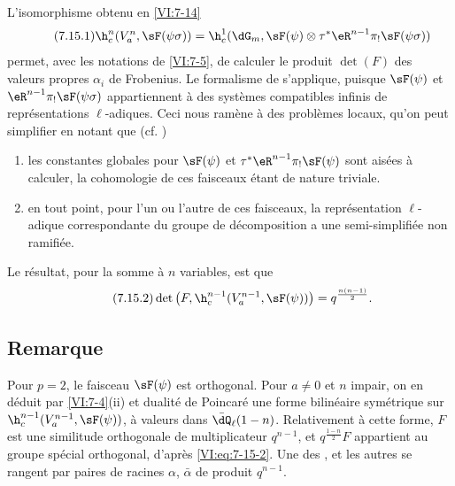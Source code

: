 L'isomorphisme obtenu en \ref{VI:7-14} 
\begin{equation*}\tag{7.15.1}\label{VI:eq:7-15-1}
  \h_c^n(V_a^n,\sF(\psi\sigma)) = \h_c^1(\dG_m,\sF(\psi)\otimes \tau^\ast \eR^{n-1} \pi_! \sF(\psi\sigma)) 
\end{equation*}
permet, avec les notations de \ref{VI:7-5}, de calculer le produit $\det(F)$ 
des valeurs propres $\alpha_i$ de Frobenius. Le formalisme de  
s'applique, puisque $\sF(\psi)$ et $\eR^{n-1} \pi_! \sF(\psi\sigma)$ 
appartiennent à des systèmes compatibles infinis de représentations 
$\ell$-adiques. Ceci nous ramène à des problèmes locaux, qu'on peut 
simplifier en notant que (cf. ) 
\begin{enumerate}[\indent a)]
  \item les constantes globales pour 
    $\sF(\psi)$ et $\tau^\ast \eR^{n-1} \pi_! \sF(\psi)$ sont aisées à 
    calculer, la cohomologie de ces faisceaux étant de nature triviale. 
  \item en tout point, pour l'un ou l'autre de ces faisceaux, la 
    représentation $\ell$-adique correspondante du groupe de décomposition 
    a une semi-simplifiée non ramifiée. 
\end{enumerate}

Le résultat, pour la somme à $n$ variables, est que 
\begin{equation*}\tag{7.15.2}\label{VI:eq:7-15-2}
  \det\left(F,\h_c^{n-1}(V_a^{n-1},\sF(\psi))\right) = q^{\frac{n(n-1)}{2}} \text{.} 
\end{equation*}





\subsection{Remarque}\label{VI:7-16}

Pour $p=2$, le faisceau $\sF(\psi)$ est orthogonal. Pour $a\ne 0$ et $n$ 
impair, on en déduit par \ref{VI:7-4}(ii) et dualité de Poincaré une 
forme bilinéaire symétrique sur $\h_c^{n-1}(V_a^{n-1},\sF(\psi))$, à 
valeurs dans $\bar\dQ_\ell(1-n)$. Relativement à cette forme, $F$ est une 
similitude orthogonale de multiplicateur $q^{n-1}$, et $q^{\frac{1-n}{2}} F$ 
appartient au groupe spécial orthogonal, d'après \eqref{VI:eq:7-15-2}. Une 
des , et les autres se 
rangent par paires de racines $\alpha$, $\bar\alpha$ de produit $q^{n-1}$. 


